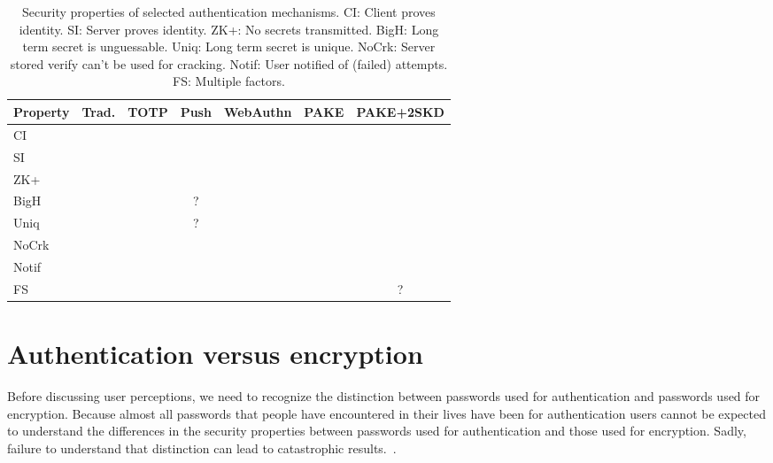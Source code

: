 \documentclass[12pt]{article}
\newcommand{\cmark}{\ding{51}}%
\newcommand{\xmark}{\ding{53}}%
\newcommand{\prop}[1]{\textsf{#1}}
\begin{document}
\begin{table}
  \begin{tabular}{lcccccc}
    \toprule
    \textbf{Property} & \textbf{Trad.}   & \textbf{TOTP}    & \textbf{Push}  & \textbf{WebAuthn}  & \textbf{PAKE}   & \textbf{PAKE+2SKD} \\
    \midrule
    \prop{CI}       & \cmark  & \cmark  & \cmark  & \cmark & \cmark  & \cmark \\
    \prop{SI}       & \xmark  & \xmark  & \xmark  & \cmark & \cmark  & \cmark \\
    \prop{ZK+}      & \xmark  & \cmark  & \cmark  & \cmark & \cmark  & \cmark \\
    \prop{BigH}     & \xmark  & \cmark  & ?       & \cmark & \xmark  & \cmark \\
    \prop{Uniq}     & \xmark  & \cmark  & ?       & \cmark & \xmark  & \cmark \\
    \prop{NoCrk}    & \xmark  & \xmark  & \xmark  & \cmark & \xmark  & \cmark \\
    \prop{Notif}    & \xmark  & \xmark  & \cmark  & \xmark & \xmark  & \xmark \\
    \prop{FS}       & \xmark  & \cmark  & \cmark  & \cmark & \xmark  & ?      \\
    \bottomrule
  \end{tabular}
  \caption[Security properties of selected authentication mechanisms]
      {Security properties of selected authentication mechanisms.
        \prop{CI}: Client proves identity.
        \prop{SI}: Server proves identity.
        \prop{ZK+}: No secrets transmitted.
        \prop{BigH}: Long term secret is unguessable.
        \prop{Uniq}: Long term secret is unique.
        \prop{NoCrk}: Server stored verify can't be used for cracking.
        \prop{Notif}: User notified of (failed) attempts.
        \prop{FS}: Multiple factors.}\label{tab:props}
\end{table}

\section{Authentication versus encryption}

Before discussing user perceptions, we need to recognize the distinction between passwords used for authentication and passwords used for encryption.
Because almost all passwords that people have encountered in their lives have been for authentication users cannot be expected to understand the differences in the security properties between passwords used for authentication and those used for encryption.
Sadly, failure to understand that distinction can lead to catastrophic results.~\autocite{Blaze2011:cablegate}.
\end{document}

